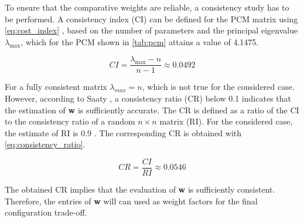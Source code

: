 To ensure that the comparative weights are reliable, a consistency study has to be performed. A consistency index (CI) can be defined for the PCM matrix using \autoref{eq:cost_index} \cite{SAATY19909}, based on the number of parameters and the principal eigenvalue $\lambda_\text{max}$, which for the PCM shown in \autoref{tab:pcm} attains a value of 4.1475.



\begin{equation}
\label{eq:cost_index}
    CI = \frac{\lambda_\text{max}-n}{n-1}\approx0.0492
\end{equation}

For a fully consistent matrix $\lambda_{max} = n$, which is not true for the considered case. However, according to Saaty \cite{SAATY19909}, a consistency ratio (CR) below 0.1 indicates that the estimation of \textbf{w} is sufficiently accurate. The CR is defined as a ratio of the CI to the consistency ratio of a random $n\times n$ matrix (RI). For the considered case, the estimate of RI is 0.9 \cite{DecisionMakingAHP}. The corresponding CR is obtained with \autoref{eq:consistency_ratio}.

\begin{equation}
\label{eq:consistency_ratio}
    CR = \frac{CI}{RI} \approx 0.0546
\end{equation}

The obtained CR implies that the evaluation of \textbf{w} is sufficiently consistent. Therefore, the entries of \textbf{w} will can used as weight factors for the final configuration trade-off.
    

